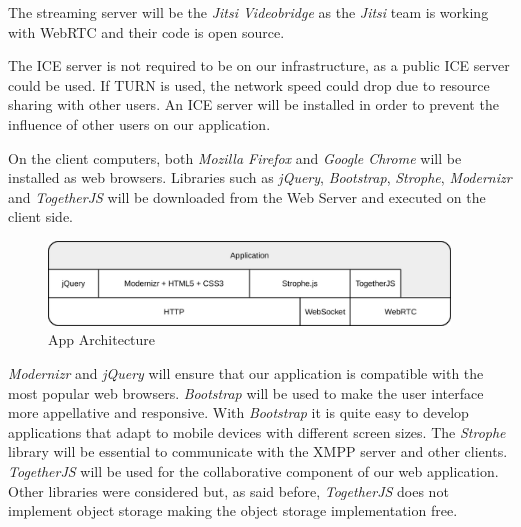 The streaming server will be the \emph{Jitsi Videobridge} as the \emph{Jitsi} team is working with \ac{WebRTC} and their code is open source.

The \ac{ICE} server is not required to be on our infrastructure, as a public \ac{ICE} server could be used. If \ac{TURN} is used, the network speed could drop due to resource sharing with other users. An \ac{ICE} server will be installed in order to prevent the influence of other users on our application.

On the client computers, both \emph{Mozilla Firefox} and \emph{Google Chrome} will be installed as web browsers. Libraries such as \emph{jQuery}, \emph{Bootstrap}, \emph{Strophe}, \emph{Modernizr} and \emph{TogetherJS} will be downloaded from the Web Server and executed on the client side.

\begin{figure}[H]
	\centering
	\includegraphics[width=0.95\textwidth]{figures/apparch.png}
	\caption{App Architecture}
\end{figure}

\emph{Modernizr} and \emph{jQuery} will ensure that our application is compatible with the most popular web browsers.
\emph{Bootstrap} will be used to make the user interface more appellative and responsive. With \emph{Bootstrap} it is quite easy to develop applications that adapt to mobile devices with different screen sizes.
The \emph{Strophe} library will be essential to communicate with the \ac{XMPP} server and other clients.
\emph{TogetherJS} will be used for the collaborative component of our web application. Other libraries were considered but, as said before, \emph{TogetherJS} does not implement object storage making the object storage implementation free.

